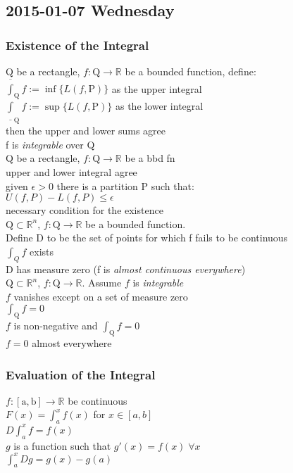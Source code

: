 
\subsection{2015-01-07 Wednesday}
\subsubsection{Existence of the Integral}
\LET Q be a rectangle, $f:\mathrm{Q}\to\mathbb{R}$ be a bounded function, define:\\
$\overline{\int}_{\mathrm{Q}} f := \inf\{L(f, \mathrm{P})\}$ as the upper integral\\
$\underline{\int}_{\mathrm{Q}} f := \sup\{L(f, \mathrm{P})\}$ as the lower integral\\
\IF then the upper and lower sums agree\\
\THEN f is \textit{integrable} over Q\\

\LET Q be a rectangle, $f:\mathrm{Q}\to\mathbb{R}$ be a bbd fn\\
\THEN upper and lower integral agree\\
\IFF given $\epsilon>0$ there is a partition P such that:\\
$U(f,P) - L(f,P)\leq\epsilon$\\
\IDEA necessary condition for the existence\\

\LET $\mathrm{Q}\subset\mathbb{R}^n$, $f:\mathrm{Q}\to\mathbb{R}$ be a bounded function.\\
Define D to be the set of points for which f fails to be continuous\\
\THEN $\int_{Q} f$ exists\\
\IFF D has measure zero (f is \textit{almost continuous everywhere})\\

\LET $\mathrm{Q}\subset\mathbb{R}^n$, 
$f:\mathrm{Q}\to\mathbb{R}$.
Assume $f$ is \textit{integrable}\\
\IF $f$ vanishes except on a set of measure zero\\
\THEN $\int_{\mathrm{Q}}f = 0$\\
\IF $f$ is non-negative and $\int_{\mathrm{Q}}f = 0$\\
\THEN $f=0$ almost everywhere

\subsubsection{Evaluation of the Integral}
\LET $f:\mathrm{[a,b]}\to\mathbb{R}$ be continuous\\
\IF $F(x)=\int_a^xf(x)$ for $x\in[a,b]$\\
\THEN $D\int_a^xf=f(x)$\\
\IF $g$ is a function such that $g'(x)=f(x)\;\forall x$\\
\THEN $\int_a^x Dg = g(x)-g(a)$\\

